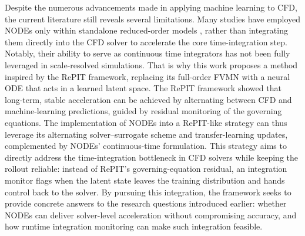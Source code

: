 Despite the numerous advancements made in applying machine learning to CFD, the current literature still reveals several limitations. Many studies have employed NODEs only within standalone reduced-order models \cite{Rojas2021, Shankar2022}, rather than integrating them directly into the CFD solver to accelerate the core time-integration step. Notably, their ability to serve as continuous time integrators has not been fully leveraged in scale-resolved simulations. That is why this work proposes a method inspired by the RePIT framework, replacing its full-order FVMN with a neural ODE that acts in a learned latent space. The RePIT framework showed that long-term, stable acceleration can be achieved by alternating between CFD and machine-learning predictions, guided by residual monitoring of the governing equations. The implementation of NODEs into a RePIT-like strategy can thus leverage its alternating solver--surrogate scheme and transfer-learning updates, complemented by NODEs' continuous-time formulation. This strategy aims to directly address the time-integration bottleneck in CFD solvers while keeping the rollout reliable: instead of RePIT's governing-equation residual, an integration monitor flags when the latent state leaves the training distribution and hands control back to the solver. By pursuing this integration, the framework seeks to provide concrete answers to the research questions introduced earlier: whether NODEs can deliver solver-level acceleration without compromising accuracy, and how runtime integration monitoring can make such integration feasible.